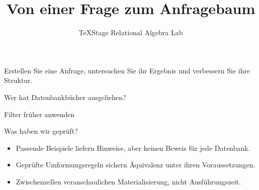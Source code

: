 \documentclass[aspectratio=169]{beamer}
\title{Von einer Frage zum Anfragebaum}
\author{TeXStage Relational Algebra Lab}
\date{}
\begin{document}
\begin{frame}\titlepage
\small Erstellen Sie eine Anfrage, untersuchen Sie ihr Ergebnis und verbessern Sie ihre Struktur.
\end{frame}
\begin{frame}{Wer hat Datenbankbücher ausgeliehen?}
\end{frame}
\begin{frame}{Filter früher anwenden}
\end{frame}
\begin{frame}{Was haben wir geprüft?}
\begin{itemize}
\item Passende Beispiele liefern Hinweise, aber keinen Beweis für jede Datenbank.
\item Geprüfte Umformungsregeln sichern Äquivalenz unter ihren Voraussetzungen.
\item Zwischenzellen veranschaulichen Materialisierung, nicht Ausführungszeit.
\end{itemize}
\end{frame}
\end{document}
